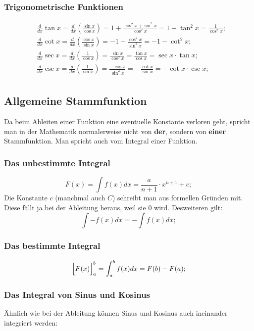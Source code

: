\documentclass[a4paper]{article}
\begin{document}
\subsubsection{Trigonometrische Funktionen}
\begin{align*}
	& \frac{d}{dx} \tan{x} = \frac{d}{dx} \left( \frac{\sin{x}}{\cos{x}} \right) = 1 + \frac{\cos^2{x} + \sin^2{x}}{\cos^2{x}} = 1 + \tan^2{x} = \frac{1}{\cos^2{x}};
	\\
	& \frac{d}{dx} \cot{x} = \frac{d}{dx} \left( \frac{\cos{x}}{\sin{x}} \right) = -1 - \frac{\cos^2{x}}{\sin^2{x}} = -1 - \cot^2{x};
	\\
	& \frac{d}{dx} \sec{x} = \frac{d}{dx} \left( \frac{1}{\cos{x}} \right) = \frac{\sin{x}}{\cos^2{x}} = \frac{\tan{x}}{\cos{x}} = \sec{x} \cdot \tan{x} ;
	\\
	& \frac{d}{dx} \csc{x} = \frac{d}{dx} \left( \frac{1}{\sin{x}} \right) = \frac{-\cos{x}}{\sin^2{x}} = -\frac{\cot{x}}{\sin{x}} = -\cot{x} \cdot \csc{x} ;
	\\
	&
\end{align*}

\subsection{Allgemeine Stammfunktion}
Da beim Ableiten einer Funktion eine eventuelle Konstante verloren geht, spricht man in der Mathematik normalerweise nicht von \textbf{der}, sondern von \textbf{einer} Stammfunktion. Man spricht auch vom Integral einer Funktion.

\subsubsection{Das unbestimmte Integral}
\[
	F(x) = \int f(x) dx = \frac{a}{n + 1} \cdot x ^ {n + 1} + c ;
\]
Die Konstante $c$ (manchmal auch $C$) schreibt man aus formellen Gr\"unden mit.
Diese f\"allt ja bei der Ableitung heraus,
weil sie $0$ wird.
Desweiteren gilt:
\[
	\int -f(x) dx = -\int f(x) dx ;
\]


\subsubsection{Das bestimmte Integral}
\[
	\Bigl[ F(x) \Bigr]_{a}^{b} = \int_{a}^{b} f(x) dx = F(b) - F(a) ;
\]

\subsubsection{Das Integral von Sinus und Kosinus}
\"Ahnlich wie bei der Ableitung k\"onnen Sinus und Kosinus auch ineinander integriert werden:
\end{document}

